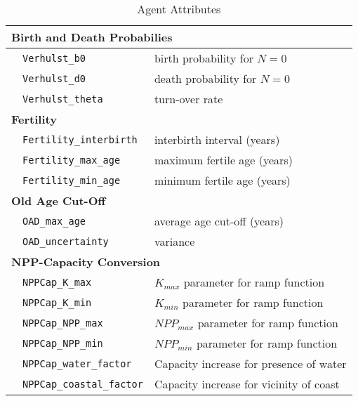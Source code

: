 \documentclass[a4paper,oneside]{article}
\begin{document}
\begin{table}[ht!]
  \begin{center}
  \caption{Agent Attributes}
  \label{tab:agt}
  \begin{tabular}{cl|l}
    \hline
    \multicolumn{3}{l}{\bf{Birth and Death Probabilies}}           \\
    \hline
    \space & \texttt{Verhulst\_b0}                  &  birth probability for $N=0$   \\
    \space & \texttt{Verhulst\_d0}                  &  death probability for $N=0$   \\
    \space & \texttt{Verhulst\_theta}               &  turn-over rate                \\
    \hline 
    \multicolumn{3}{l}{\bf{Fertility}}                                      \\
    \hline
    \space & \texttt{Fertility\_interbirth}         &  interbirth interval (years)   \\
    \space & \texttt{Fertility\_max\_age}           &  maximum fertile age (years)   \\
    \space & \texttt{Fertility\_min\_age}           &  minimum fertile age (years)   \\
    \hline
    \multicolumn{3}{l}{\bf{Old Age Cut-Off}}                                \\
    \hline
    \space & \texttt{OAD\_max\_age}                 &  average age cut-off (years)   \\
    \space & \texttt{OAD\_uncertainty}              &  variance                      \\
    \hline
    \multicolumn{3}{l}{\bf{NPP-Capacity Conversion}}                                 \\
    \hline
    \space & \texttt{NPPCap\_K\_max}                & $K_{max}$ parameter for ramp function   \\
    \space & \texttt{NPPCap\_K\_min}                & $K_{min}$ parameter for ramp function   \\
    \space & \texttt{NPPCap\_NPP\_max}              & $NPP_{max}$ parameter for ramp function \\
    \space & \texttt{NPPCap\_NPP\_min}              & $NPP_{min}$ parameter for ramp function \\
    \space & \texttt{NPPCap\_water\_factor}         & Capacity increase for presence of water \\
    \space & \texttt{NPPCap\_coastal\_factor}       & Capacity increase for vicinity of coast \\


\end{tabular}
\end{center}
\end{table}
\end{document}
